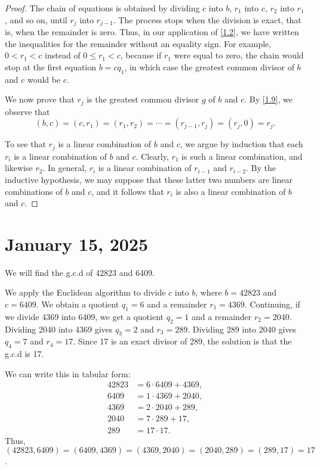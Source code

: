 \documentclass[11pt]{article}
\begin{document}
\begin{proof}
	The chain of equations is obtained by dividing \(c\) into \(b\), \(r_1\) into \(c\), \(r_2\) into \(r_1\), and so on, until \(r_j\) into \(r_{j-1}\). The process stops when the division is exact, that is, when the remainder is zero. Thus, in our application of \cref{1.2}, we have written the inequalities for the remainder without an equality sign. For example, \(0 < r_1 < c\) instead of \(0 \leq r_1 < c\), because if \(r_1\) were equal to zero, the chain would stop at the first equation \(b = cq_1\), in which case the greatest common divisor of \(b\) and \(c\) would be \(c\).

	We now prove that \(r_j\) is the greatest common divisor \(g\) of \(b\) and
	\(c\). By \cref{1.9}, we observe that
	\[
		(b, c) = (c, r_1) = (r_1, r_2) = \cdots = (r_{j-1}, r_j) = (r_j, 0) = r_j.
	\]

	To see that \(r_j\) is a linear combination of \(b\) and \(c\), we argue by
	induction that each \(r_i\) is a linear combination of \(b\) and \(c\).
	Clearly, \(r_1\) is such a linear combination, and likewise \(r_2\). In
	general, \(r_i\) is a linear combination of \(r_{i-1}\) and \(r_{i-2}\). By the
	inductive hypothesis, we may suppose that these latter two numbers are linear
	combinations of \(b\) and \(c\), and it follows that \(r_i\) is also a linear
	combination of \(b\) and \(c\).
\end{proof}

\section{January 15, 2025}
\begin{example}
	We will find the g.c.d of 42823 and 6409.
\end{example}
\begin{solution}

	We apply the Euclidean algorithm to divide \(c\) into \(b\), where \(b =
	42823\) and \(c = 6409\). We obtain a quotient \(q_1 = 6\) and a remainder
	\(r_1 = 4369\). Continuing, if we divide 4369 into 6409, we get a quotient
	\(q_2 = 1\) and a remainder \(r_2 = 2040\). Dividing 2040 into 4369 gives \(q_3
	= 2\) and \(r_3 = 289\). Dividing 289 into 2040 gives \(q_4 = 7\) and \(r_4 =
	17\). Since 17 is an exact divisor of 289, the solution is that the g.c.d is
	17.

	We can write this in tabular form:
	\[
		\begin{aligned}
			42823 & = 6 \cdot 6409 + 4369, \\
			6409  & = 1 \cdot 4369 + 2040, \\
			4369  & = 2 \cdot 2040 + 289,  \\
			2040  & = 7 \cdot 289 + 17,    \\
			289   & = 17 \cdot 17.
		\end{aligned}
	\]
	Thus, \((42823, 6409) = (6409, 4369) = (4369, 2040) = (2040, 289) = (289, 17) =
	17\).
\end{solution}
\end{document}
